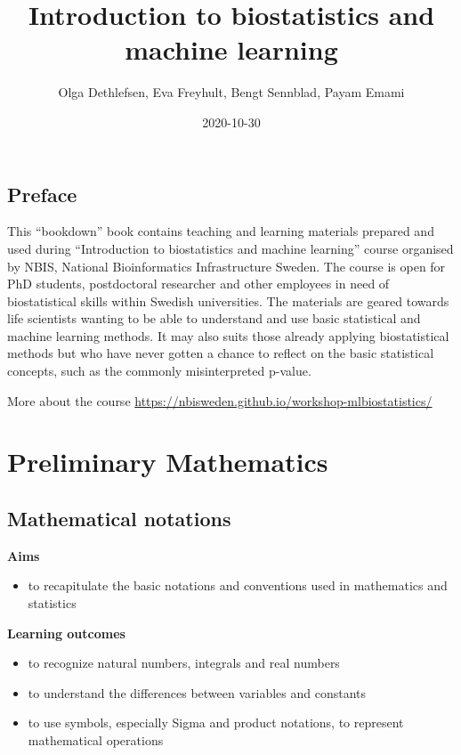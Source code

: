\documentclass[
]{book}
\title{Introduction to biostatistics and machine learning}
\author{Olga Dethlefsen, Eva Freyhult, Bengt Sennblad, Payam Emami}
\date{2020-10-30}
\providecommand{\tightlist}{%
  \setlength{\itemsep}{0pt}\setlength{\parskip}{0pt}}
\theoremstyle{definition}
\theoremstyle{definition}
\theoremstyle{definition}
\theoremstyle{remark}
\begin{document}
\maketitle

{
\setcounter{tocdepth}{1}
\tableofcontents
}
\hypertarget{preface}{%
\chapter*{Preface}\label{preface}}

This ``bookdown'' book contains teaching and learning materials prepared and used during ``Introduction to biostatistics and machine learning'' course organised by NBIS, National Bioinformatics Infrastructure Sweden. The course is open for PhD students, postdoctoral researcher and other employees in need of biostatistical skills within Swedish universities. The materials are geared towards life scientists wanting to be able to understand and use basic statistical and machine learning methods. It may also suits those already applying biostatistical methods but who have never gotten a chance to reflect on the basic statistical concepts, such as the commonly misinterpreted p-value.

More about the course \url{https://nbisweden.github.io/workshop-mlbiostatistics/}

\hypertarget{part-preliminary-mathematics}{%
\part{Preliminary Mathematics}\label{part-preliminary-mathematics}}

\hypertarget{mathematical-notations}{%
\chapter{Mathematical notations}\label{mathematical-notations}}

\textbf{Aims}

\begin{itemize}
\tightlist
\item
  to recapitulate the basic notations and conventions used in mathematics and statistics
\end{itemize}

\textbf{Learning outcomes}

\begin{itemize}
\tightlist
\item
  to recognize natural numbers, integrals and real numbers
\item
  to understand the differences between variables and constants
\item
  to use symbols, especially Sigma and product notations, to represent mathematical operations
\end{itemize}
\end{document}
